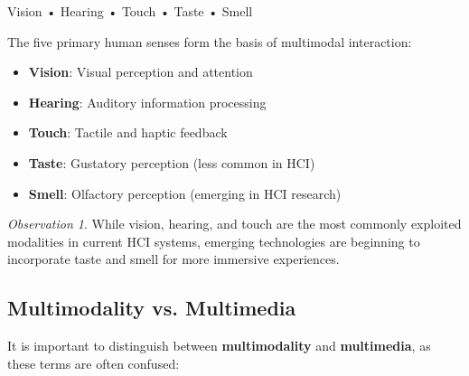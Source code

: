 \documentclass[11pt,a4paper]{article}
\theoremstyle{definition}
\theoremstyle{plain}
\theoremstyle{remark}
\newtheorem*{observation}{Observation}
\begin{document}
\begin{tcolorbox}[colback=cyan!5!white,colframe=cyan!75!black,title=\textbf{The Five Human Senses}]
\begin{center}
Vision • Hearing • Touch • Taste • Smell
\end{center}
\end{tcolorbox}

The five primary human senses form the basis of multimodal interaction:

\begin{itemize}
    \item \textbf{Vision}: Visual perception and attention
    \item \textbf{Hearing}: Auditory information processing
    \item \textbf{Touch}: Tactile and haptic feedback
    \item \textbf{Taste}: Gustatory perception (less common in HCI)
    \item \textbf{Smell}: Olfactory perception (emerging in HCI research)
\end{itemize}

\begin{observation}
While vision, hearing, and touch are the most commonly exploited modalities in current HCI systems, emerging technologies are beginning to incorporate taste and smell for more immersive experiences.
\end{observation}

\subsection{Multimodality vs. Multimedia}

It is important to distinguish between \textbf{multimodality} and \textbf{multimedia}, as these terms are often confused:
\end{document}
